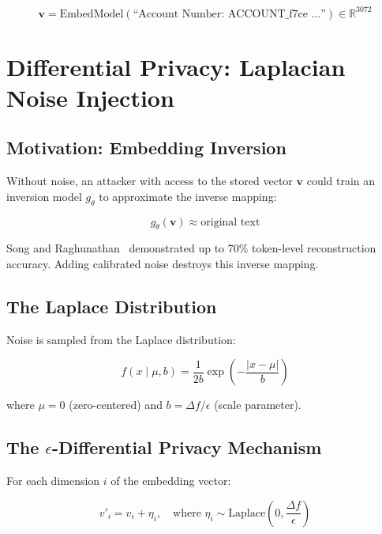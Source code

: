 \begin{equation}
\mathbf{v} = \text{EmbedModel}(\text{``Account Number: ACCOUNT\_f7ce ...''})\in \mathbb{R}^{3072}
\end{equation}

\section{Differential Privacy: Laplacian Noise Injection}

\subsection{Motivation: Embedding Inversion}

Without noise, an attacker with access to the stored vector $\mathbf{v}$ could train an inversion model $g_\theta$ to approximate the inverse mapping:

\begin{equation}
g_\theta(\mathbf{v}) \approx \text{original text}
\end{equation}

Song and Raghunathan~\cite{song2020information} demonstrated up to 70\% token-level reconstruction accuracy. Adding calibrated noise destroys this inverse mapping.

\subsection{The Laplace Distribution}

Noise is sampled from the Laplace distribution:

\begin{equation}
\boxed{f(x \mid \mu, b) = \frac{1}{2b} \exp\left(-\frac{|x - \mu|}{b}\right)}
\label{eq:laplace}
\end{equation}

where $\mu = 0$ (zero-centered) and $b = \Delta f / \epsilon$ (scale parameter).

\subsection{The $\epsilon$-Differential Privacy Mechanism}

For each dimension $i$ of the embedding vector:

\begin{equation}
\boxed{v'_i = v_i + \eta_i, \quad \text{where } \eta_i \sim \text{Laplace}\left(0, \frac{\Delta f}{\epsilon}\right)}
\label{eq:dp}
\end{equation}

